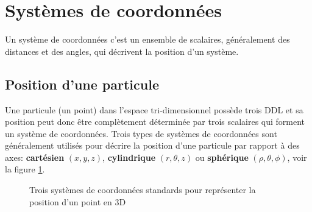 
\section{Systèmes de coordonnées}
\label{sec:syscoord}

Un système de coordonnées c'est un ensemble de scalaires, généralement des distances et des angles, qui décrivent la position d'un système. 

\subsection{Position d'une particule}
\label{sec:syscoordparticule}

Une particule (un point) dans l'espace tri-dimensionnel possède trois DDL et sa position peut donc être complètement déterminée par trois scalaires qui forment un système de coordonnées. Trois types de systèmes de coordonnées sont généralement utilisés pour décrire la position d'une particule par rapport à des axes: \textbf{cartésien} $( x, y, z)$, \textbf{cylindrique} $( r, \theta, z)$ ou \textbf{sphérique} $( \rho, \theta, \phi)$, voir la figure \ref{fig:coorsys}. 

\begin{figure}[H]
        \centering
        \caption{Trois systèmes de coordonnées standards pour représenter la position d'un point en 3D}
				\label{fig:coorsys}
\end{figure}

